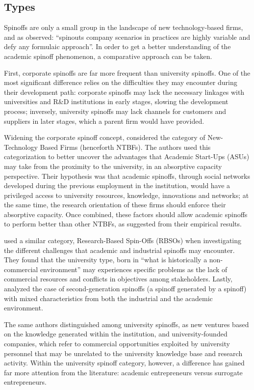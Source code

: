 \subsection{Types}

Spinoffs are only a small group in the landscape of new technology-based firms, and as \citet{Franklin2001} observed: \enquote{spinouts company scenarios in practices are highly variable and defy any formulaic approach}. In order to get a better understanding of the academic spinoff phenomenon, a comparative approach can be taken.

First, corporate spinoffs are far more frequent than university spinoffs. One of the most significant difference relies on the difficulties they may encounter during their development path: corporate spinoffs may lack the necessary linkages with universities and R\&D institutions in early stages, slowing the development process; inversely, university spinoffs may lack channels for customers and suppliers in later stages, which a parent firm would have provided.

Widening the corporate spinoff concept, \citet{Colombo2010} considered the category of New-Technology Based Firms (henceforth NTBFs). The authors used this categorization to better uncover the advantages that Academic Start-Ups (ASUs) may take from the proximity to the university, in an absorptive capacity perspective. Their hypothesis was that academic spinoffs, through social networks developed during the previous employment in the institution, would have a privileged access to university resources, knowledge, innovations and networks; at the same time, the research orientation of these firms should enforce their absorptive capacity. Once combined, these factors should allow academic spinoffs to perform better than other NTBFs, as suggested from their empirical results.

\citet{Mustar2006} used a similar category, Research-Based Spin-Offs (RBSOs) when investigating the different challenges that academic and industrial spinoffs may encounter. They found that the university type, born in \enquote{what is historically a non-commercial environment} may experiences specific problems as the lack of commercial resources and conflicts in objectives among stakeholders. Lastly, \citet{Leitch2005} analyzed the case of  second-generation spinoffs (a spinoff generated by a spinoff) with mixed characteristics from both the industrial and the academic environment.

The same authors distinguished among university spinoffs, as new ventures based on the knowledge generated within the institution, and university-founded companies, which refer to commercial opportunities exploited by university personnel that may be unrelated to the university knowledge base and research activity. Within the university spinoff category, however, a difference has gained far more attention from the literature: academic entrepreneurs versus surrogate entrepreneurs.


